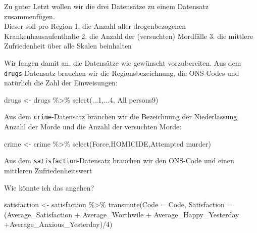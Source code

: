 \documentclass[
]{book}
\newenvironment{Shaded}{\begin{snugshade}}{\end{snugshade}}
\newcommand{\AttributeTok}[1]{\textcolor[rgb]{0.77,0.63,0.00}{#1}}
\newcommand{\DecValTok}[1]{\textcolor[rgb]{0.00,0.00,0.81}{#1}}
\newcommand{\FunctionTok}[1]{\textcolor[rgb]{0.00,0.00,0.00}{#1}}
\newcommand{\NormalTok}[1]{#1}
\newcommand{\OtherTok}[1]{\textcolor[rgb]{0.56,0.35,0.01}{#1}}
\newcommand{\SpecialCharTok}[1]{\textcolor[rgb]{0.00,0.00,0.00}{#1}}
\newcommand{\StringTok}[1]{\textcolor[rgb]{0.31,0.60,0.02}{#1}}
\begin{document}
Zu guter Letzt wollen wir die drei Datensätze zu einem Datensatz zusammenfügen.\\
Dieser soll pro Region
1. die Anzahl aller drogenbezogenen Krankenhausaufenthalte
2. die Anzahl der (versuchten) Mordfälle
3. die mittlere Zufriedenheit über alle Skalen beinhalten

Wir fangen damit an, die Datensätze wie gewünscht vorzubereiten.
Aus dem \texttt{drugs}-Datensatz brauchen wir die Regionsbezeichnung, die ONS-Codes und natürlich die Zahl der Einweisungen:

\begin{Shaded}
\begin{Highlighting}[]
\NormalTok{drugs }\OtherTok{\textless{}{-}}\NormalTok{ drugs }\SpecialCharTok{\%\textgreater{}\%} 
  \FunctionTok{select}\NormalTok{(...}\DecValTok{1}\NormalTok{,...}\DecValTok{4}\NormalTok{, }\StringTok{\textasciigrave{}}\AttributeTok{All persons9}\StringTok{\textasciigrave{}}\NormalTok{)}
\end{Highlighting}
\end{Shaded}

Aus dem \texttt{crime}-Datensatz brauchen wir die Bezeichnung der Niederlassung, Anzahl der Morde und die Anzahl der versuchten Morde:

\begin{Shaded}
\begin{Highlighting}[]
\NormalTok{crime }\OtherTok{\textless{}{-}}\NormalTok{ crime }\SpecialCharTok{\%\textgreater{}\%} 
  \FunctionTok{select}\NormalTok{(Force,HOMICIDE,}\StringTok{\textasciigrave{}}\AttributeTok{Attempted murder}\StringTok{\textasciigrave{}}\NormalTok{)}
\end{Highlighting}
\end{Shaded}

Aus dem \texttt{satisfaction}-Datensatz brauchen wir den ONS-Code und einen mittleren Zufriedenheitswert

Wie könnte ich das angehen?

\begin{Shaded}
\begin{Highlighting}[]
\NormalTok{satisfaction }\OtherTok{\textless{}{-}}\NormalTok{ satisfaction }\SpecialCharTok{\%\textgreater{}\%} 
  \FunctionTok{transmute}\NormalTok{(}\AttributeTok{Code =}\NormalTok{ Code,}
            \AttributeTok{Satisfaction =}\NormalTok{ (Average\_Satisfaction }\SpecialCharTok{+}\NormalTok{ Average\_Worthwile }\SpecialCharTok{+} 
\NormalTok{              Average\_Happy\_Yesterday }\SpecialCharTok{+}\NormalTok{Average\_Anxious\_Yesterday)}\SpecialCharTok{/}\DecValTok{4}\NormalTok{)}
\end{Highlighting}
\end{Shaded}
\end{document}
